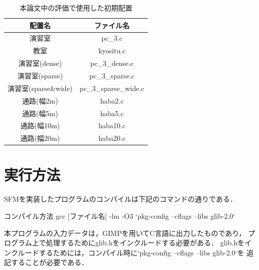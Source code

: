 \begin{table}[H]
  \begin{center}
    \caption{本論文中の評価で使用した初期配置}
    \label{tb:arrangement_gimp_files}
    \begin{tabular}{c|c}
      \hline \hline
      配置名 & ファイル名 \\ \hline
      演習室 & pc\_3.c \\ \hline
      教室 & kyositu.c \\ \hline
      演習室(dense) & pc\_3\_dense.c \\ \hline
      演習室(sparse) & pc\_3\_sparse.c \\ \hline
      演習室(sparse\&wide) & pc\_3\_sparse\_wide.c \\ \hline
      通路(幅2m) & haba2.c \\ \hline
      通路(幅5m) & haba5.c \\ \hline
      通路(幅10m)& haba10.c \\ \hline
      通路(幅20m)& haba20.c \\ \hline
    \end{tabular}
  \end{center}
\end{table}


\section{実行方法}
SFMを実装したプログラムのコンパイルは下記のコマンドの通りである．
\begin{itembox}[l]{コンパイル方法}
  gcc [ファイル名] -lm -O3 `pkg-config --cflags --libs glib-2.0`
\end{itembox}
本プログラムの入力データは，GIMPを用いてC言語に出力したものであり，
プログラム上で処理するためにglib.hをインクルードする必要がある．
glib.hをインクルードするためには，コンパイル時に`pkg-config --cflags --libs glib-2.0`を
追記することが必要である．

